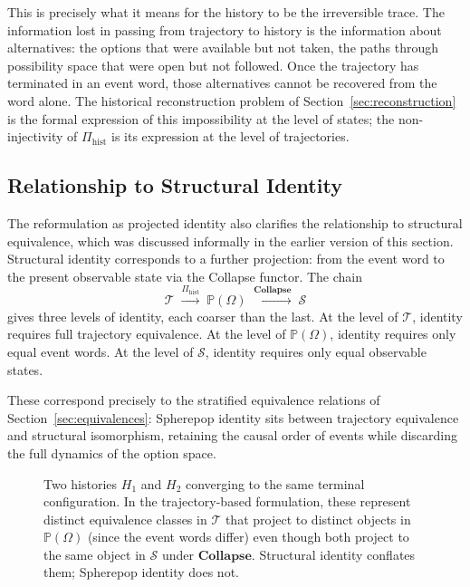 \documentclass[12pt]{article}
\theoremstyle{plain}
\theoremstyle{definition}
\theoremstyle{remark}
\newcommand{\Collapse}{\mathbf{Collapse}}
\newcommand{\PathCat}{\mathbb{P}(\Omega)}
\begin{document}
This is precisely what it means for the history to be the irreversible trace.
The information lost in passing from trajectory to history is the information
about alternatives: the options that were available but not taken, the paths
through possibility space that were open but not followed.  Once the trajectory
has terminated in an event word, those alternatives cannot be recovered from the
word alone.  The historical reconstruction problem of Section~\ref{sec:reconstruction}
is the formal expression of this impossibility at the level of states; the
non-injectivity of $\Pi_{\mathrm{hist}}$ is its expression at the level of
trajectories.

\subsection{Relationship to Structural Identity}

The reformulation as projected identity also clarifies the relationship to
structural equivalence, which was discussed informally in the earlier version
of this section.  Structural identity corresponds to a further projection:
from the event word to the present observable state via the Collapse functor.
The chain
\[
  \mathcal{T}
  \;\xrightarrow{\Pi_{\mathrm{hist}}}\;
  \PathCat
  \;\xrightarrow{\Collapse}\;
  \mathcal{S}
\]
gives three levels of identity, each coarser than the last.  At the level of
$\mathcal{T}$, identity requires full trajectory equivalence.  At the level of
$\PathCat$, identity requires only equal event words.  At the level of
$\mathcal{S}$, identity requires only equal observable states.

These correspond precisely to the stratified equivalence relations of
Section~\ref{sec:equivalences}: Spherepop identity sits between trajectory
equivalence and structural isomorphism, retaining the causal order of events
while discarding the full dynamics of the option space.

\begin{figure}[ht]
\centering
{}
\caption{Two histories $H_1$ and $H_2$ converging to the same terminal
configuration.  In the trajectory-based formulation, these represent distinct
equivalence classes in $\mathcal{T}$ that project to distinct objects in
$\PathCat$ (since the event words differ) even though both project to the same
object in $\mathcal{S}$ under $\Collapse$.  Structural identity conflates them;
Spherepop identity does not.}
\label{fig:identity}
\end{figure}
\end{document}
